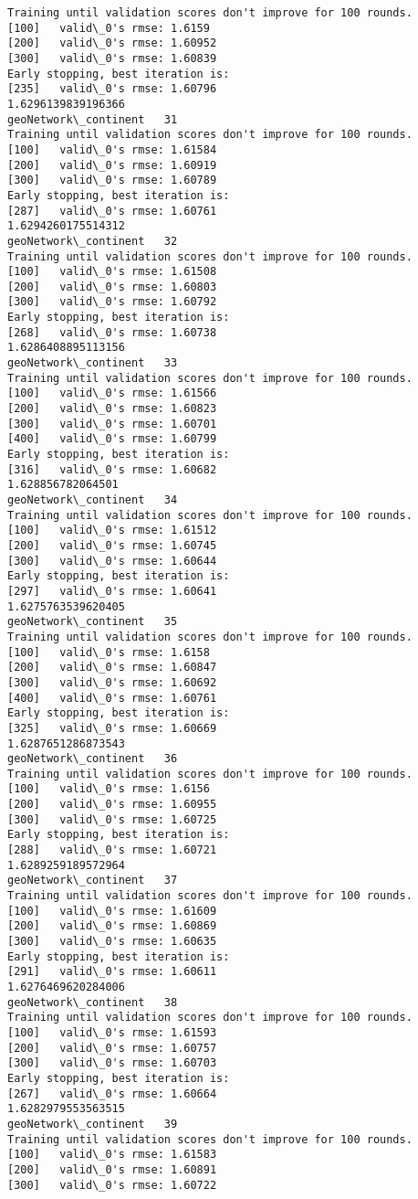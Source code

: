 \documentclass[11pt]{article}
\begin{document}
\begin{Verbatim}[commandchars=\\\{\}]
Training until validation scores don't improve for 100 rounds.
[100]	valid\_0's rmse: 1.6159
[200]	valid\_0's rmse: 1.60952
[300]	valid\_0's rmse: 1.60839
Early stopping, best iteration is:
[235]	valid\_0's rmse: 1.60796
1.6296139839196366
geoNetwork\_continent   31
Training until validation scores don't improve for 100 rounds.
[100]	valid\_0's rmse: 1.61584
[200]	valid\_0's rmse: 1.60919
[300]	valid\_0's rmse: 1.60789
Early stopping, best iteration is:
[287]	valid\_0's rmse: 1.60761
1.6294260175514312
geoNetwork\_continent   32
Training until validation scores don't improve for 100 rounds.
[100]	valid\_0's rmse: 1.61508
[200]	valid\_0's rmse: 1.60803
[300]	valid\_0's rmse: 1.60792
Early stopping, best iteration is:
[268]	valid\_0's rmse: 1.60738
1.6286408895113156
geoNetwork\_continent   33
Training until validation scores don't improve for 100 rounds.
[100]	valid\_0's rmse: 1.61566
[200]	valid\_0's rmse: 1.60823
[300]	valid\_0's rmse: 1.60701
[400]	valid\_0's rmse: 1.60799
Early stopping, best iteration is:
[316]	valid\_0's rmse: 1.60682
1.628856782064501
geoNetwork\_continent   34
Training until validation scores don't improve for 100 rounds.
[100]	valid\_0's rmse: 1.61512
[200]	valid\_0's rmse: 1.60745
[300]	valid\_0's rmse: 1.60644
Early stopping, best iteration is:
[297]	valid\_0's rmse: 1.60641
1.6275763539620405
geoNetwork\_continent   35
Training until validation scores don't improve for 100 rounds.
[100]	valid\_0's rmse: 1.6158
[200]	valid\_0's rmse: 1.60847
[300]	valid\_0's rmse: 1.60692
[400]	valid\_0's rmse: 1.60761
Early stopping, best iteration is:
[325]	valid\_0's rmse: 1.60669
1.6287651286873543
geoNetwork\_continent   36
Training until validation scores don't improve for 100 rounds.
[100]	valid\_0's rmse: 1.6156
[200]	valid\_0's rmse: 1.60955
[300]	valid\_0's rmse: 1.60725
Early stopping, best iteration is:
[288]	valid\_0's rmse: 1.60721
1.6289259189572964
geoNetwork\_continent   37
Training until validation scores don't improve for 100 rounds.
[100]	valid\_0's rmse: 1.61609
[200]	valid\_0's rmse: 1.60869
[300]	valid\_0's rmse: 1.60635
Early stopping, best iteration is:
[291]	valid\_0's rmse: 1.60611
1.6276469620284006
geoNetwork\_continent   38
Training until validation scores don't improve for 100 rounds.
[100]	valid\_0's rmse: 1.61593
[200]	valid\_0's rmse: 1.60757
[300]	valid\_0's rmse: 1.60703
Early stopping, best iteration is:
[267]	valid\_0's rmse: 1.60664
1.6282979553563515
geoNetwork\_continent   39
Training until validation scores don't improve for 100 rounds.
[100]	valid\_0's rmse: 1.61583
[200]	valid\_0's rmse: 1.60891
[300]	valid\_0's rmse: 1.60722

\end{Verbatim}
\end{document}
